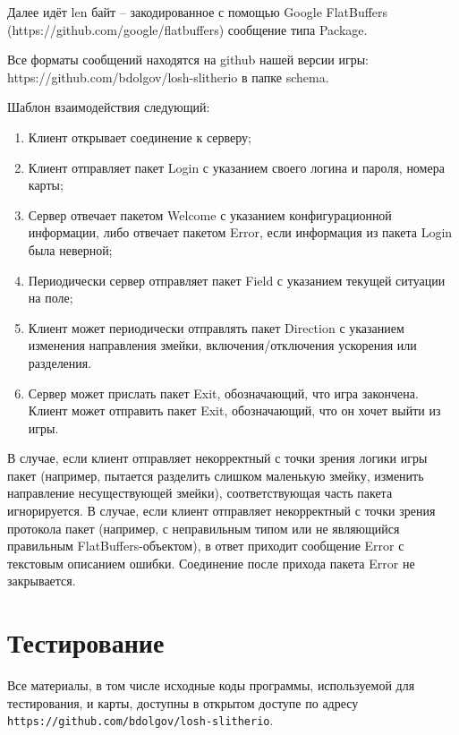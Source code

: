 \documentclass[12pt, a4paper]{article}
\begin{document}
Далее идёт len байт -- закодированное с помощью Google FlatBuffers (https://github.com/google/flatbuffers) сообщение типа Package.

Все форматы сообщений находятся на github нашей версии игры: https://github.com/bdolgov/losh-slitherio в папке schema.

Шаблон взаимодействия следующий:
\begin{enumerate}
\item Клиент открывает соединение к серверу;
\item Клиент отправляет пакет Login с указанием своего логина и пароля, номера карты;
\item Сервер отвечает пакетом Welcome с указанием конфигурационной информации, либо отвечает пакетом Error, если информация из пакета Login была неверной;
\item Периодически сервер отправляет пакет Field с указанием текущей ситуации на поле;
\item Клиент может периодически отправлять пакет Direction с указанием изменения направления змейки, включения/отключения ускорения или разделения.
\item Сервер может прислать пакет Exit, обозначающий, что игра закончена. Клиент может отправить пакет Exit, обозначающий, что он хочет выйти из игры.
\end{enumerate}

В случае, если клиент отправляет некорректный с точки зрения логики игры пакет (например, пытается разделить слишком маленькую змейку, изменить направление несуществующей змейки), соответствующая часть пакета игнорируется. В случае, если клиент отправляет некорректный с точки зрения протокола пакет (например, с неправильным типом или не являющийся правильным FlatBuffers-объектом), в ответ приходит сообщение Error с текстовым описанием ошибки. Соединение после прихода пакета Error не закрывается. 

{\section{Тестирование}}

Все материалы, в том числе исходные коды программы, используемой для тестирования, и карты, доступны в открытом доступе по адресу
\texttt{https://github.com/bdolgov/losh-slitherio}.
\end{document}
